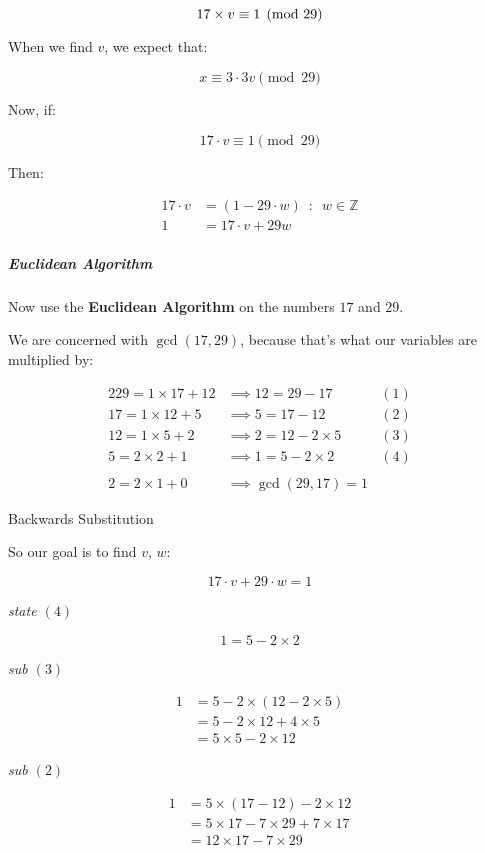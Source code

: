 \documentclass[
]{article}
\begin{document}
\[17 \times v \equiv 1 \pmod{29} \\\]

When we find \(v\), we expect that:

\[x \equiv 3 \cdot 3v \pmod{29}\]

Now, if:

\[17\cdot v \equiv 1 \pmod{29}\]

Then:

\begin{align}
17\cdot v &= (1-29\cdot w) \enspace : \enspace w \in \mathbb{Z}\\
1 &= 17\cdot v + 29w
\end{align}

\hypertarget{header-n625}{%
\subparagraph{Euclidean Algorithm}\label{header-n625}}

Now use the \textbf{Euclidean Algorithm} on the numbers \(17\) and
\(29\).

We are concerned with \(\gcd(17,29)\), because that's what our variables
are multiplied by:

\begin{alignat}{2}
29 = 1 \times 17 + 12 &\implies 12 = 29-17 \qquad &(1) \\
17 = 1\times 12 + 5 &\implies 5 = 17-12 \qquad &(2) \\
12 = 1\times 5 + 2 &\implies 2 = 12-2\times 5 \qquad &(3) \\
5 = 2 \times 2 + 1 & \implies 1 = 5 - 2 \times 2 \qquad & (4) \\
\ \\
2 = 2\times 1 + 0 &\implies \gcd(29, 17) = 1 &
\end{alignat}

Backwards Substitution

So our goal is to find \(v\), \(w\):

\[17\cdot v + 29 \cdot w =1\]

\emph{state \((4)\)}

\[1 = 5 -2\times2\]

\emph{sub \((3)\)}

\begin{align}
1 &= 5 - 2 \times (12-2 \times 5) \\
&= 5 - 2 \times 12 + 4 \times 5 \\
&= 5 \times 5 - 2 \times 12
\end{align}

\emph{sub \((2)\)}

\begin{align}
1 &= 5 \times (17 - 12) - 2 \times 12 \\
  &= 5 \times 17 - 7 \times 29 + 7 \times 17 \\
  &= 12 \times 17 - 7 \times 29 \\
\end{align}
\end{document}
